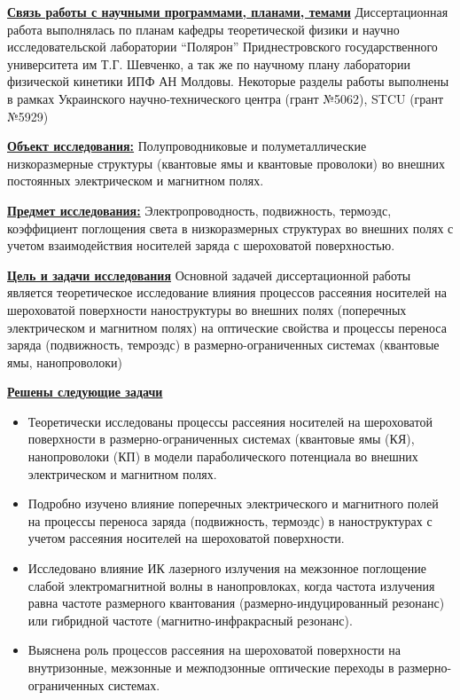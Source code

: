 \underline{\textbf{Связь работы с научными программами, планами, темами}}
Диссертационная работа выполнялась по планам кафедры теоретической физики и научно исследовательской лаборатории “Полярон” Приднестровского государственного университета им Т.Г. Шевченко, а так же по научному плану лаборатории физической кинетики ИПФ АН Молдовы. Некоторые разделы работы выполнены в рамках Украинского научно-технического центра (грант №5062), STCU (грант №5929)

\underline{\textbf{Объект исследования:}} Полупроводниковые и полуметаллические низкоразмерные структуры (квантовые ямы и квантовые проволоки) во внешних постоянных электрическом и магнитном полях.

\underline{\textbf{Предмет исследования:}} Электропроводность, подвижность, термоэдс, коэффициент поглощения света в низкоразмерных структурах во внешних полях с учетом взаимодействия носителей заряда с шероховатой поверхностью.

\underline{\textbf{Цель и задачи исследования}}
Основной задачей диссертационной работы является теоретическое исследование влияния процессов рассеяния носителей на шероховатой поверхности наноструктуры во внешних полях (поперечных электрическом и магнитном полях) на оптические свойства и процессы переноса заряда (подвижность, темроэдс) в размерно-ограниченных системах (квантовые ямы, нанопроволоки)

\underline{\textbf{Решены следующие задачи}}
\begin{itemize}
	\item Теоретически исследованы процессы рассеяния носителей на шероховатой поверхности в размерно-ограниченных системах (квантовые ямы (КЯ), нанопроволоки (КП) в модели параболического потенциала во внешних электрическом и магнитном полях.
	\item Подробно изучено влияние поперечных электрического и магнитного полей на процессы переноса заряда (подвижность, термоэдс) в наноструктурах с учетом рассеяния носителей на шероховатой поверхности.
	\item Исследовано влияние ИК лазерного излучения на межзонное поглощение слабой электромагнитной волны в нанопровлоках, когда частота излучения равна частоте размерного квантования (размерно-индуцированный резонанс) или гибридной частоте (магнитно-инфракрасный резонанс).
	\item Выяснена роль процессов рассеяния на шероховатой поверхности на внутризонные, межзонные и межподзонные оптические переходы в размерно-ограниченных системах.
\end{itemize}

